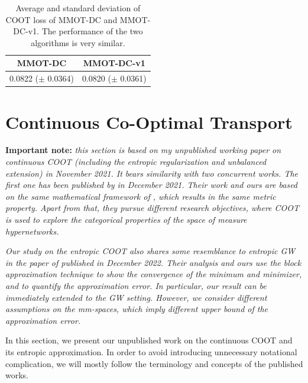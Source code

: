 \begin{table}[H]
  \label{tab:coot_new}
  \begin{center}
    \begin{small}
      \begin{sc}
        \begin{tabular}{|c|c|}
          \hline
          MMOT-DC & MMOT-DC-v1 \\
          \hline
          0.0822 ($\pm$ 0.0364) & 0.0820 ($\pm$ 0.0361) \\
          \hline
        \end{tabular}
      \end{sc}
    \end{small}
  \end{center}
  \caption{Average and standard deviation of COOT loss of MMOT-DC and MMOT-DC-v1. The performance of the two algorithms is
  very similar.}
\end{table}

\section{Continuous Co-Optimal Transport}

\textbf{Important note:} \textit{this section is based on my unpublished working paper
on continuous COOT (including the entropic regularization and unbalanced extension) in November 2021.
It bears similarity with two concurrent works. The first one has been published
by \citep{Chowdhury21b} in December 2021. Their work and ours are based on the same
mathematical framework of \citep{Chowdhury19}, which results in the same metric property.
Apart from that, they pursue different research objectives,
where COOT is used to explore the categorical properties of the space of measure hypernetworks.}

\textit{Our study on the entropic COOT also shares some resemblance to
entropic GW in the paper of \citep{Zhang23} published in December 2022.
Their analysis and ours use the block approximation technique \citep{Carlier17}
to show the convergence of the minimum and minimizer, and to quantify the approximation error.
In particular, our result can be immediately extended to the GW setting. However,
we consider different assumptions on the mm-spaces,
which imply different upper bound of the approximation error.}

In this section, we present our unpublished work on the continuous COOT and its entropic approximation.
In order to avoid introducing unnecessary notational complication,
we will mostly follow the terminology and concepts of the published works.

